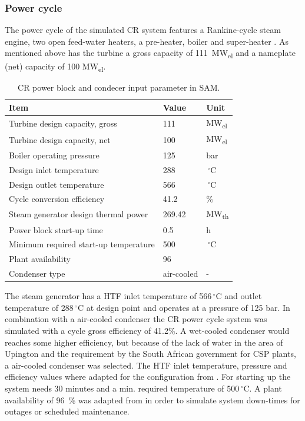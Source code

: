 \subsubsection{Power cycle}
The power cycle of the simulated CR system features a Rankine-cycle steam engine, two open feed-water heaters, a pre-heater, boiler and super-heater \cite{NREL2015a}. As mentioned above has the turbine a gross capacity of 111~MW\textsubscript{el} and a nameplate (net) capacity of 100 MW\textsubscript{el}. 
\begin{table}[!h]  
  \centering
	\begin{tabular}{  p{7.0cm}  C{2.0cm}  C{2.0cm} } 
	\hline	
\textbf{Item} & \textbf{Value} & \textbf{Unit} \\ \hline \hline
Turbine design capacity, gross  & 111 & MW\textsubscript{el} \\ 
Turbine design capacity, net & 100 & MW\textsubscript{el} \\ 
Boiler operating pressure & 125 & bar \\ 
Design inlet temperature & 288 & $\,^{\circ}\mathrm{C}$ \\ 
Design outlet temperature & 566 & $\,^{\circ}\mathrm{C}$ \\ 
Cycle conversion efficiency & 41.2 & \% \\ 
Steam generator design thermal power & 269.42 & MW\textsubscript{th}  \\
Power block start-up time & 0.5 & h \\ 
Minimum required start-up temperature & 500 & $\,^{\circ}\mathrm{C}$ \\
Plant availability  & 96 & \\
Condenser type & air-cooled & - \\ 
\hline
\end{tabular}
\caption[CR power block and condecer input parameter in SAM.]{CR power block and condecer input parameter in SAM.}\label{tbl: CRPowerplant}
\end{table}
The steam generator has a HTF inlet temperature of 566$\,^{\circ}\mathrm{C}$ and outlet temperature of 288$\,^{\circ}\mathrm{C}$ at design point and operates at a pressure of 125 bar. In combination with a air-cooled condenser the CR power cycle system was simulated with a cycle gross efficiency of 41.2\%. A wet-cooled condenser would reaches some higher efficiency, but because of the lack of water in the area of Upington and the requirement by the South African government for CSP plants, a air-cooled condenser was selected. The HTF inlet temperature, pressure and efficiency values where adapted for the configuration from \cite{Kolb2011a}. For starting up the system 
needs 30 minutes and a min. required temperature of 500$\,^{\circ}\mathrm{C}$. A plant availability of 96~\% was adapted from \cite{Morin2012} in order to simulate system down-times for outages or scheduled maintenance.
